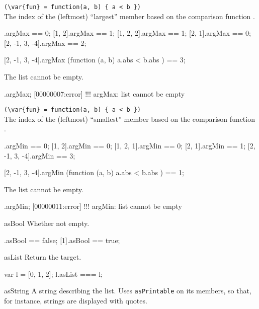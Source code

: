 \begin{urbiscriptapi}
\item {}\lstinline|(\var{fun} = function(a, b) { a < b })|\\%
  The index of the (leftmost) ``largest'' member based on the comparison
  function .
\begin{urbiassert}
           [1].argMax == 0;
        [1, 2].argMax == 1;
     [1, 2, 2].argMax == 1;
        [2, 1].argMax == 0;
[2, -1, 3, -4].argMax == 2;

[2, -1, 3, -4].argMax (function (a, b) { a.abs < b.abs }) == 3;
\end{urbiassert}

The list cannot be empty.

\begin{urbiscript}
[].argMax;
[00000007:error] !!! argMax: list cannot be empty
\end{urbiscript}


\item {}\lstinline|(\var{fun} = function(a, b) { a < b })|\\%
  The index of the (leftmost) ``smallest'' member based on the comparison
  function .
\begin{urbiassert}
           [1].argMin == 0;
        [1, 2].argMin == 0;
     [1, 2, 1].argMin == 0;
        [2, 1].argMin == 1;
[2, -1, 3, -4].argMin == 3;

[2, -1, 3, -4].argMin (function (a, b) { a.abs < b.abs }) == 1;
\end{urbiassert}

The list cannot be empty.

\begin{urbiscript}
[].argMin;
[00000011:error] !!! argMin: list cannot be empty
\end{urbiscript}


\item[asBool]
  Whether not empty.
\begin{urbiassert}
[].asBool == false;
[1].asBool == true;
\end{urbiassert}


\item[asList]
  Return the target.

\begin{urbiassert}
var l = [0, 1, 2];
l.asList === l;
\end{urbiassert}


\item[asString]
  A string describing the list.  Uses \lstinline|asPrintable| on its
  members, so that, for instance, strings are displayed with quotes.


\end{urbiscriptapi}
